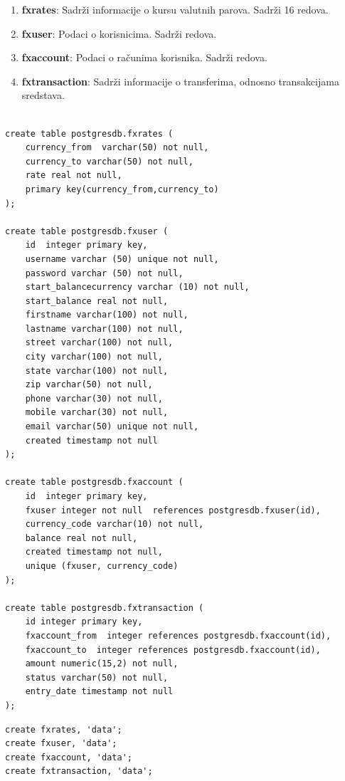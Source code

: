 \documentclass[12pt,oneside]{memoir}
\begin{document}
\begin{enumerate}
\item[\textbullet] \textbf{fxrates}: {
	Sadrži informacije o kursu valutnih parova. Sadrži 16 redova.
}
\item[\textbullet] \textbf{fxuser}:{
	Podaci o korisnicima. Sadrži   redova.
}
\item[\textbullet] \textbf{fxaccount}:{
	Podaci o računima korisnika. Sadrži   redova.
}
\item[\textbullet] \textbf{fxtransaction}:{
	Sadrži informacije o transferima, odnosno transakcijama sredstava.
}
\end{enumerate}



\begin{lstlisting}[title={setup-postgres-model.sql},captionpos=t]

create table postgresdb.fxrates (
	currency_from  varchar(50) not null,
	currency_to varchar(50) not null,
	rate real not null,
	primary key(currency_from,currency_to)
);

create table postgresdb.fxuser (
	id  integer primary key,
	username varchar (50) unique not null,
	password varchar (50) not null,
	start_balancecurrency varchar (10) not null,
	start_balance real not null,
	firstname varchar(100) not null,
	lastname varchar(100) not null,
	street varchar(100) not null,
	city varchar(100) not null,
	state varchar(100) not null,
	zip varchar(50) not null,
	phone varchar(30) not null,
	mobile varchar(30) not null,
	email varchar(50) unique not null,
	created timestamp not null
);

create table postgresdb.fxaccount (
	id  integer primary key,
	fxuser integer not null  references postgresdb.fxuser(id),
	currency_code varchar(10) not null,
	balance real not null,
	created timestamp not null,
	unique (fxuser, currency_code)
);

create table postgresdb.fxtransaction (
	id integer primary key,
	fxaccount_from  integer references postgresdb.fxaccount(id),
	fxaccount_to  integer references postgresdb.fxaccount(id),
	amount numeric(15,2) not null,
	status varchar(50) not null,
	entry_date timestamp not null
);

\end{lstlisting}

\begin{lstlisting}[title={setup-hbase-model.sh},captionpos=t]
create fxrates, 'data';
create fxuser, 'data';
create fxaccount, 'data';
create fxtransaction, 'data';
\end{lstlisting}
\end{document}
